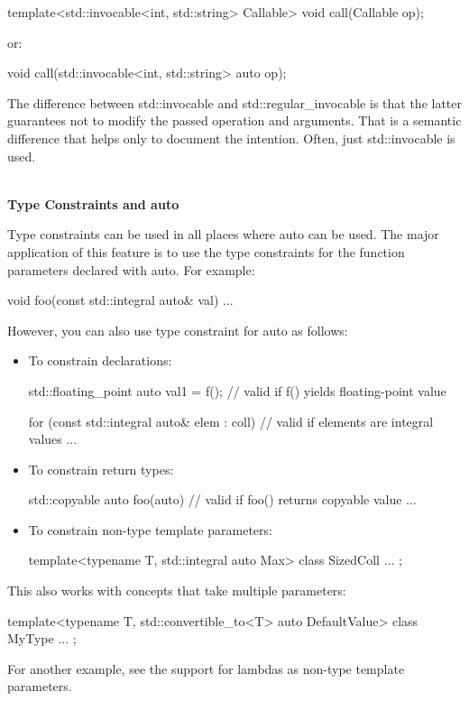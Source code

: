 \begin{cpp}
template<std::invocable<int, std::string> Callable>
void call(Callable op);
\end{cpp}

or:

\begin{cpp}
void call(std::invocable<int, std::string> auto op);
\end{cpp}

The difference between std::invocable and std::regular\_invocable is that the latter guarantees not to modify the passed operation and arguments. That is a semantic difference that helps only to document the intention. Often, just std::invocable is used.

\noindent
\hspace*{\fill} \\ %
\textbf{Type Constraints and auto}

Type constraints can be used in all places where auto can be used. The major application of this feature is to use the type constraints for the function parameters declared with auto. For example:

\begin{cpp}
void foo(const std::integral auto& val)
{
	...
}
\end{cpp}

However, you can also use type constraint for auto as follows:

\begin{itemize}
\item
To constrain declarations:

\begin{cpp}
std::floating_point auto val1 = f(); // valid if f() yields floating-point value

for (const std::integral auto& elem : coll) { // valid if elements are integral values
	...
}
\end{cpp}

\item
To constrain return types:

\begin{cpp}
std::copyable auto foo(auto) { // valid if foo() returns copyable value
	...
}
\end{cpp}

\item
To constrain non-type template parameters:

\begin{cpp}
template<typename T, std::integral auto Max>
class SizedColl {
	...
};
\end{cpp}
\end{itemize}

This also works with concepts that take multiple parameters:

\begin{cpp}
template<typename T, std::convertible_to<T> auto DefaultValue>
class MyType {
	...
};
\end{cpp}

For another example, see the support for lambdas as non-type template parameters.












